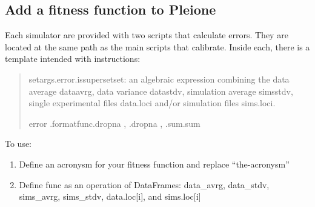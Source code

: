 \documentclass[letterpaper,10pt,english]{sphinxmanual}
\begin{document}
\subsection{Add a fitness function to Pleione}
\label{\detokenize{functions/addFitness:add-a-fitness-function-to-pleione}}\label{\detokenize{functions/addFitness::doc}}
Each simulator are provided with two scripts that calculate errors. They are
located at the same path as the main scripts that calibrate. Inside each,
there is a template intended with instructions:
\begin{quote}

\begin{sphinxVerbatim}[commandchars=\\\{\}]
 setargs.error.issupersetset\PYG{o}{[}\PYG{o}{]}:
          
          an algebraic expression combining the data average data\PYGZus{}avrg, data variance data\PYGZus{}stdv, simulation average sims\PYGZus{}stdv,
        single experimental files data.loc\PYG{o}{[}i\PYG{o}{]} and/or simulation files sims.loc\PYG{o}{[}i\PYG{o}{]}.

        error\PYG{o}{[}\PYG{o}{]}  .formatfunc.dropna  ,   .dropna  ,   .sum.sum
\end{sphinxVerbatim}
\end{quote}

To use:
\begin{enumerate}
\def\theenumi{\arabic{enumi}}
\def\labelenumi{\theenumi )}
\makeatletter\def\p@enumii{\p@enumi \theenumi )}\makeatother
\item {} 
Define an acronysm for your fitness function and replace “the-acronysm”

\item {} 
Define func as an operation of DataFrames: data\_avrg, data\_stdv, sims\_avrg, sims\_stdv, data.loc{[}i{]}, and sims.loc{[}i{]}

\end{enumerate}
\end{document}
